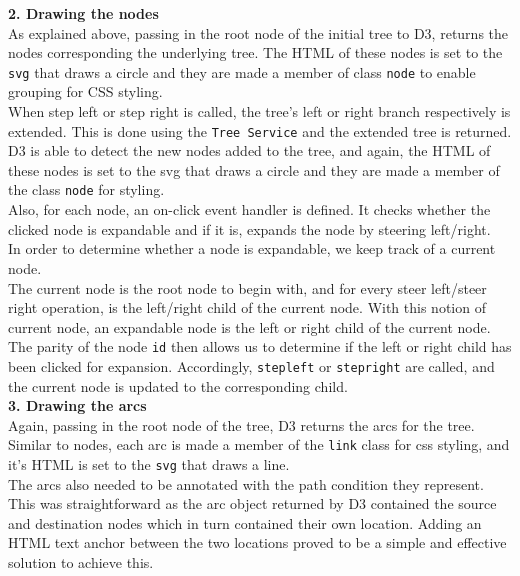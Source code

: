 \documentclass[titlepage,11pt]{article}
\begin{document}
\textbf{2. Drawing the nodes} \\

As explained above, passing in the root node of the initial tree to D3, returns the nodes corresponding the underlying tree. The HTML of these nodes is set to the \texttt{svg} that draws a circle and they are made a member of class \texttt{node} to enable grouping for CSS styling. \\

When step left or step right is called, the tree's left or right branch respectively is extended. This is done using the \texttt{Tree Service} and the extended tree is returned. D3 is able to detect the new nodes added to the tree, and again, the HTML of these nodes is set to the svg that draws a circle and they are  made a member of the class \texttt{node} for styling. \\

Also, for each node, an on-click event handler is defined. It checks whether the clicked node is expandable and if it is, expands the node by steering left/right. \\

In order to determine whether a node is expandable, we keep track of a current node. \\

The current node is the root node to begin with, and for every steer left/steer right operation, is the left/right child of the current node. With this notion of current node, an expandable node is the left or right child of the current node. \\

The parity of the node \texttt{id} then allows us to determine if the left or right child has been clicked for expansion. Accordingly, \texttt{stepleft} or \texttt{stepright} are called, and the current node is updated to the corresponding child. \\

\textbf{3. Drawing the arcs} \\
Again, passing in the root node of the tree, D3 returns the arcs for the tree. Similar to nodes, each arc is made a member of the \texttt{link} class for css styling, and it's HTML is set to the \texttt{svg} that draws a line. \\

The arcs also needed to be annotated with the path condition they represent.
This was straightforward as the arc object returned by D3 contained the source and destination nodes which in turn contained their own location. Adding an HTML text anchor between the two locations proved to be a simple and effective solution to achieve this.
\end{document}
